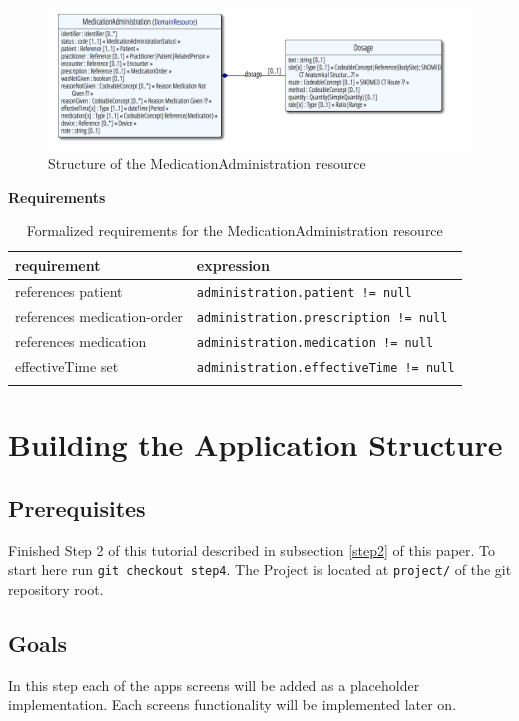 \documentclass{article}
\begin{document}
\begin{figure}[H]
\centering
\includegraphics[width=\linewidth]{resources/FHIR/MedicationAdministration/MedicationAdministration-UML.png}
\caption{Structure of the MedicationAdministration resource}
\label{fig:structure-medication-administration}
\end{figure}

\textbf{Requirements}\label{res:medicationadministration:requirements}
\begin{longtable}[H]{@{}ll@{}}
  \toprule
    requirement &
    expression
  \\
  \midrule
    references patient &
    \texttt{administration.patient\ !=\ null}
  \\
    references medication-order &
    \texttt{administration.prescription\ !=\ null}
  \\
    references medication &
    \texttt{administration.medication\ !=\ null}
  \\
    effectiveTime set &
    \texttt{administration.effectiveTime\ !=\ null}
  \\
  \bottomrule
\caption{Formalized requirements for the MedicationAdministration resource}
\end{longtable}

\section{Building the Application
Structure}\label{step4}

\subsection{Prerequisites}\label{step4:prerequisites}
Finished Step 2 of this tutorial described in subsection \ref{step2} of this paper.
To start here run \texttt{git checkout step4}.
The Project is located at \texttt{project/} of the git repository root.

\subsection{Goals}\label{step4:goals}
In this step each of the apps screens will be added as a placeholder
implementation. Each screens functionality will be implemented later on.
\end{document}
